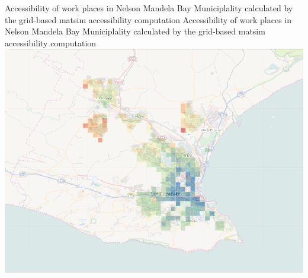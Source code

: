 
%

\createfigure%
{Accessibility of work places in Nelson Mandela Bay Municiplality calculated
	by the grid-based \gls{matsim} accessibility computation}%
{Accessibility of work places in Nelson Mandela Bay Municiplality calculated
	by the grid-based \gls{matsim} accessibility computation}%
{\label{fig:accessibility-nmbm}}%
{\includegraphics[width=0.99\hsize]{extending/figures/accessibility/w_freeSpeed_snapshot.png}}%
{}

